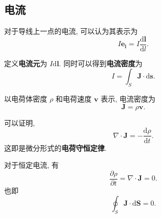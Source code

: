 \subsection{电流}
对于导线上一点的电流, 可以认为其表示为
\begin{equation*}
    I\bm{e_l}=I\frac{\mathrm{d}\bm{l}}{\mathrm{d}l}.
\end{equation*}

定义\textbf{电流元}为 $I\mathrm{d}\bm{l}$. 同时可以得到\textbf{电流密度}为
\begin{equation}
    I=\int_S\bm{J}\cdot\mathrm{d}\bm{s}.
\end{equation}

以电荷体密度 $\rho$ 和电荷速度 $\bm{v}$ 表示, 电流密度为
\begin{equation}
    \bm{J}=\rho\bm{v}.
\end{equation}

可以证明,
\begin{equation}
    \nabla\cdot\bm{J}=-\frac{\mathrm{d}\rho}{\mathrm{d}t}.
\end{equation}
这即是微分形式的\textbf{电荷守恒定律}.

对于恒定电流, 有
\begin{equation}
    \frac{\partial\rho}{\partial t}=\nabla\cdot\bm{J}=0.
\end{equation}
也即
\begin{equation}
    \oint_S\bm{J}\cdot\mathrm{d}\bm{S}=0.
\end{equation}
